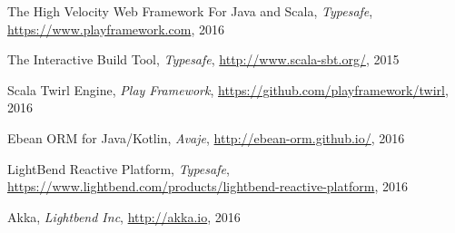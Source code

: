 \documentclass[12pt,twoside,a4paper]{report}
\begin{document}
\begin{thebibliography}{99}
The High Velocity Web Framework For Java and Scala,
\emph{Typesafe},
\url{https://www.playframework.com},
2016

The Interactive Build Tool,
\emph{Typesafe},
\url{http://www.scala-sbt.org/},
2015

Scala Twirl Engine,
\emph{Play Framework},
\url{https://github.com/playframework/twirl},
2016

Ebean ORM for Java/Kotlin,
\emph{Avaje},
\url{http://ebean-orm.github.io/},
2016

LightBend Reactive Platform,
\emph{Typesafe},
\url{https://www.lightbend.com/products/lightbend-reactive-platform},
2016

Akka,
\emph{Lightbend Inc},
\url{http://akka.io},
2016

\end{thebibliography}
\end{document}
